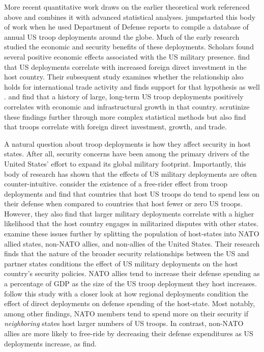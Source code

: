 More recent quantitative work draws on the earlier theoretical work referenced above and combines it with advanced statistical analyses.  jumpstarted this body of work when he used Department of Defense reports to compile a database of annual US troop deployments around the globe. Much of the early research studied the economic and security benefits of these deployments. Scholars found several positive economic effects associated with the US military presence.  find that US deployments correlate with increased foreign direct investment in the host country. Their subsequent study examines whether the relationship also holds for international trade activity and finds support for that hypothesis as well \cite{biglaiserandderouen2009}.  and  find that a history of large, long-term US troop deployments positively correlates with economic and infrastructural growth in that country.   scrutinize these findings further through more complex statistical methods but also find that troops correlate with foreign direct investment, growth, and trade.

A natural question about troop deployments is how they affect security in host states. After all, security concerns have been among the primary drivers of the United States' effort to expand its global military footprint. Importantly, this body of research has shown that the effects of US military deployments are often counter-intuitive.  consider the existence of a free-rider effect from troop deployments and find that countries that host US troops do tend to spend less on their defense when compared to countries that host fewer or zero US troops. However, they also find that larger military deployments correlate with a higher likelihood that the host country engages in militarized disputes with other states.  examine these issues further by splitting the population of host-states into NATO allied states, non-NATO allies, and non-allies of the United States. Their research finds that the nature of the broader security relationships between the US and partner states conditions the effect of US military deployments on the host country's security policies. NATO allies tend to increase their defense spending as a percentage of GDP as the size of the US troop deployment they host increases.
 follow this study with a closer look at how regional deployments condition the effect of direct deployments on defense spending of the host-state. Most notably, among other findings, NATO members tend to spend more on their security if \textit{neighboring} states host larger numbers of US troops. In contrast, non-NATO allies are more likely to free-ride by decreasing their defense expenditures as US deployments increase, as  find. 

